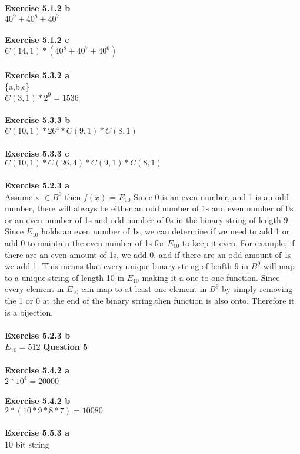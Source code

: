\documentclass{article}
\begin{document}
\textbf{Exercise 5.1.2 b}\\
$40^9 + 40^8 + 40^7$\\\\
\textbf{Exercise 5.1.2 c}\\
$C(14,1) * (40^8 + 40^7 + 40^6)$\\\\
\textbf{Exercise 5.3.2 a}\\
\{a,b,c\}\\
$C(3,1) * 2^9 = 1536$\\\\
\textbf{Exercise 5.3.3 b}\\
$C(10,1) * 26^4 * C(9,1) * C(8,1)$\\\\
\textbf{Exercise 5.3.3 c}\\
$C(10,1) * C(26,4) * C(9,1) * C(8,1)$\\\\
\textbf{Exercise 5.2.3 a}\\
Assume x $\in B^9$ then $f(x)$ = $E_{10}$ Since 0 is an even number, and 1 is an odd number, there will always be either an odd number of 1s and even number of 0s or an even number of 1s and odd number of 0s in the binary string of length 9. Since $E_{10}$ holds an even number of 1s, we can determine if we need to add 1 or add 0 to maintain the even number of 1s for $E_{10}$ to keep it even. For example, if there are an even amount of 1s, we add 0, and if there are an odd amount of 1s we add 1. This means that every unique binary string of lenfth 9 in $B^9$ will map to a unique string of length 10 in $E_{10}$ making it a one-to-one function. Since every element in $E_{10}$ can map to at least one element in $B^9$ by simply removing the 1 or 0 at the end of the binary string,then function is also onto. Therefore it is a bijection. \\\\
\textbf{Exercise 5.2.3 b}\\
$E_{10} = 512$
\newpage
\noindent \textbf{Question 5}\\\\
\textbf{Exercise 5.4.2 a}\\
$2 * 10^4 = 20000$\\\\
\textbf{Exercise 5.4.2 b}\\
$2 * (10 * 9 * 8 * 7) = 10080$\\\\
\textbf{Exercise 5.5.3 a}\\
10 bit string\\\\
\end{document}
